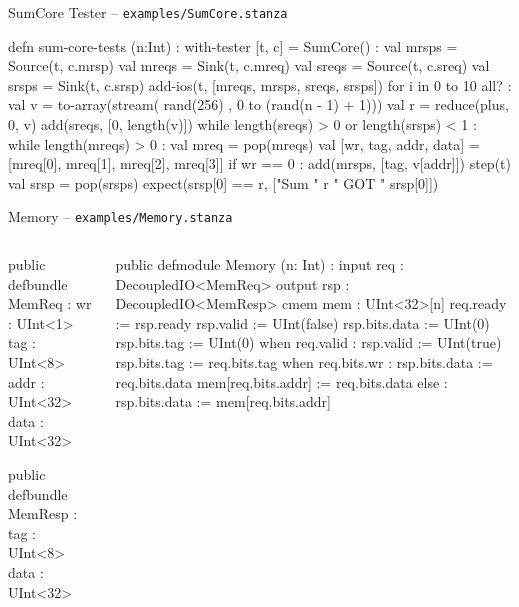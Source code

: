 \documentclass[xcolor=pdflatex,dvipsnames,table]{beamer}
\begin{document}
\begin{frame}[fragile]{SumCore Tester -- {\tt examples/SumCore.stanza}}

{
\begin{stanza}
defn sum-core-tests (n:Int) :
  with-tester [t, c] = SumCore() :
    val mrsps = Source(t, c.mrsp)
    val mreqs = Sink(t, c.mreq)
    val sreqs = Source(t, c.sreq)
    val srsps = Sink(t, c.srsp)
    add-ios(t, [mreqs, mrsps, sreqs, srsps])
    for i in 0 to 10 all? :
      val v = to-array(stream({ rand(256) }, 0 to (rand(n - 1) + 1)))
      val r = reduce(plus, 0, v)
      add(sreqs, [0, length(v)])
      while length(sreqs) > 0 or length(srsps) < 1 :
        while length(mreqs) > 0 :
          val mreq = pop(mreqs)
          val [wr, tag, addr, data] = [mreq[0], mreq[1], mreq[2], mreq[3]]
          if wr == 0 :
            add(mrsps, [tag, v[addr]])
        step(t)
      val srsp = pop(srsps)
      expect(srsp[0] == r, ["Sum " r " GOT " srsp[0]])
\end{stanza}
}

\end{frame}

\begin{frame}[fragile]{Memory -- {\tt examples/Memory.stanza}}

\begin{columns}
{
\begin{stanza}
public defbundle MemReq :
  wr   : UInt<1>
  tag  : UInt<8>
  addr : UInt<32>
  data : UInt<32>

public defbundle MemResp :
  tag  : UInt<8>
  data : UInt<32>
\end{stanza}
}

{
\begin{stanza}
public defmodule Memory (n: Int) :
  input  req : DecoupledIO<MemReq>
  output rsp : DecoupledIO<MemResp>
  cmem mem : UInt<32>[n]
  req.ready     := rsp.ready
  rsp.valid     := UInt(false)
  rsp.bits.data := UInt(0)
  rsp.bits.tag  := UInt(0)
  when req.valid :
    rsp.valid    := UInt(true)
    rsp.bits.tag := req.bits.tag
    when req.bits.wr :
      rsp.bits.data      := req.bits.data
      mem[req.bits.addr] := req.bits.data
    else :
      rsp.bits.data := mem[req.bits.addr]
\end{stanza}
}
\end{columns}

\end{frame}
\end{document}
